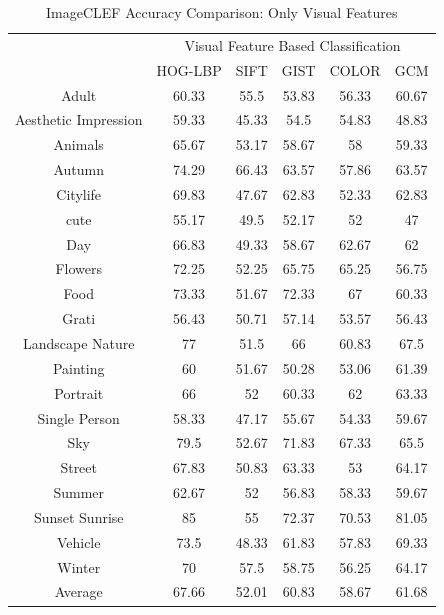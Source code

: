 \begin{table}
\centering
\caption{ ImageCLEF Accuracy Comparison: Only Visual Features} %
\vspace*{0.2 cm}
\begin{tabular}{| c | c | c | c | c | c |}
\hline
 {\multirow{2}{*}{Labels}} & \multicolumn{5}{|c|}{Visual Feature Based Classification} \\ 
 \cline{2-6}
 & HOG-LBP & SIFT & GIST & COLOR & GCM \\ [1ex] \hline
Adult & 60.33 & 55.5 & 53.83 & 56.33 & 60.67 \\ [1ex] \hline
Aesthetic Impression & 59.33 & 45.33 & 54.5 & 54.83 & 48.83 \\ [1ex] \hline
Animals & 65.67 & 53.17 & 58.67 & 58 & 59.33 \\ [1ex] \hline
Autumn & 74.29 & 66.43 & 63.57 & 57.86 & 63.57 \\ [1ex] \hline
Citylife & 69.83 & 47.67 & 62.83 & 52.33 & 62.83 \\ [1ex] \hline
cute & 55.17 & 49.5 & 52.17 & 52 & 47 \\ [1ex] \hline
Day & 66.83 & 49.33 & 58.67 & 62.67 & 62 \\ [1ex] \hline
Flowers & 72.25 & 52.25 & 65.75 & 65.25 & 56.75 \\ [1ex] \hline
Food & 73.33 & 51.67 & 72.33 & 67 & 60.33 \\ [1ex] \hline
Grati & 56.43 & 50.71 & 57.14 & 53.57 & 56.43 \\ [1ex] \hline
Landscape Nature & 77 & 51.5 & 66 & 60.83 & 67.5 \\ [1ex] \hline
Painting & 60 & 51.67 & 50.28 & 53.06 & 61.39 \\ [1ex] \hline
Portrait & 66 & 52 & 60.33 & 62 & 63.33 \\ [1ex] \hline
Single Person & 58.33 & 47.17 & 55.67 & 54.33 & 59.67 \\ [1ex] \hline
Sky & 79.5 & 52.67 & 71.83 & 67.33 & 65.5 \\ [1ex] \hline
Street & 67.83 & 50.83 & 63.33 & 53 & 64.17 \\ [1ex] \hline
Summer & 62.67 & 52 & 56.83 & 58.33 & 59.67 \\ [1ex] \hline
Sunset Sunrise & 85 & 55 & 72.37 & 70.53 & 81.05 \\ [1ex] \hline
Vehicle & 73.5 & 48.33 & 61.83 & 57.83 & 69.33 \\ [1ex] \hline
Winter & 70 & 57.5 & 58.75 & 56.25 & 64.17 \\ [1ex] \hline
Average & 67.66 & 52.01 & 60.83 & 58.67 & 61.68 \\ [1ex] \hline
\end{tabular}
\label{ImageCLEFAccuracyVisual} %
\end{table}

